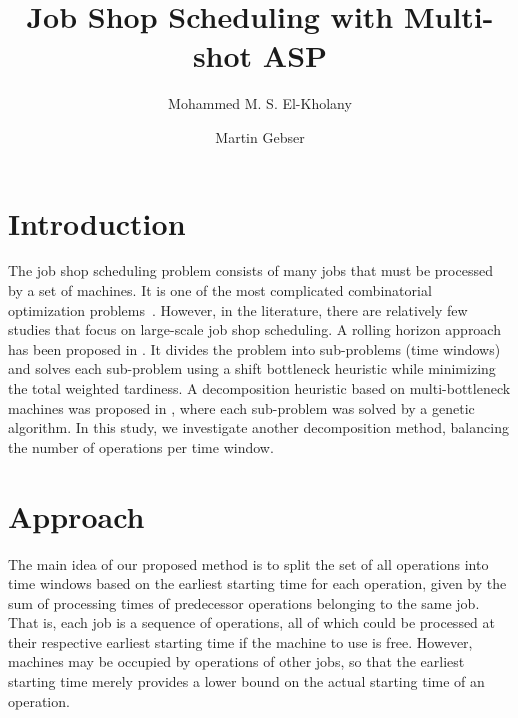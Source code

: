 \documentclass[runningheads]{llncs}
\begin{document}
%
\title{Job Shop Scheduling with Multi-shot ASP}
%
%
\author{Mohammed M. S. El-Kholany%
\and Martin Gebser}%
%
%
%
\maketitle              %
%
\section{Introduction}
The job shop scheduling problem consists of many jobs that must be processed by a set of machines.
It is one of the most complicated combinatorial optimization problems~\cite{lenstra1979computational}. However, in the literature, there are relatively few studies that focus on large-scale job shop scheduling. A rolling horizon approach has been proposed in \cite{singer2001decomposition}. It divides the problem into sub-problems (time windows) and solves each sub-problem using a shift bottleneck heuristic while minimizing the total weighted tardiness. A decomposition heuristic based on multi-bottleneck machines was proposed in \cite{zhai2014decomposition}, where each sub-problem was solved by a genetic algorithm. In this study, we investigate another decomposition method, balancing the number of operations per time window. 

\section{Approach}

The main idea of our proposed method is to split the set of all operations into time windows based on the earliest starting time for each operation, given by the sum of processing times of predecessor operations belonging to the same job.
That is, each job is a sequence of operations, all of which could be processed at their respective earliest starting time if the machine to use is free.
However, machines may be occupied by operations of other jobs,
so that the earliest starting time merely provides a lower bound on the actual starting time
of an operation.
%
\end{document}
